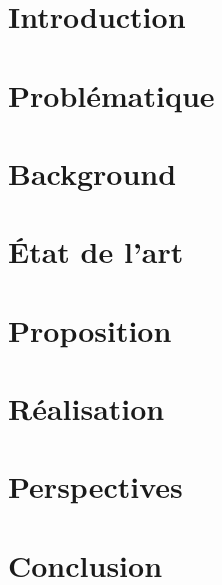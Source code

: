 \documentclass[french, 12pt]{article} %
\begin{document}
	\section{Introduction}
	 
	
	\newpage
	\section{Problématique}
	
	
	\newpage
	\section{Background}
	
	
	\newpage
	\section{État de l'art}
	
	
	
	
%	
%	
	

	
	\newpage
	\section{Proposition}
	
	
	\newpage
	\section{Réalisation}
	
	
	\newpage
	\section{Perspectives}
	
	
	\newpage
	\section{Conclusion}
	
	
	\newpage
	\printglossaries

	\newpage
	
\end{document}
